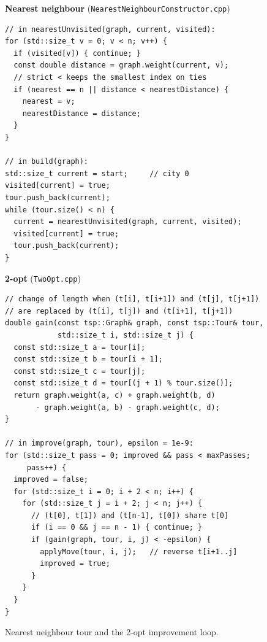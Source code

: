 \documentclass[10pt,a4paper]{article}
\begin{document}
\begin{figure}[H]
\noindent
\begin{minipage}[t]{0.45\linewidth}
\vspace{0pt}
{\footnotesize\raggedright\textbf{Nearest neighbour} (\texttt{NearestNeighbourConstructor.cpp})\par}
\begin{lstlisting}[style=side]
// in nearestUnvisited(graph, current, visited):
for (std::size_t v = 0; v < n; v++) {
  if (visited[v]) { continue; }
  const double distance = graph.weight(current, v);
  // strict < keeps the smallest index on ties
  if (nearest == n || distance < nearestDistance) {
    nearest = v;
    nearestDistance = distance;
  }
}

// in build(graph):
std::size_t current = start;     // city 0
visited[current] = true;
tour.push_back(current);
while (tour.size() < n) {
  current = nearestUnvisited(graph, current, visited);
  visited[current] = true;
  tour.push_back(current);
}
\end{lstlisting}
\end{minipage}\hfill
\begin{minipage}[t]{0.53\linewidth}
\vspace{0pt}
{\footnotesize\raggedright\textbf{2-opt} (\texttt{TwoOpt.cpp})\par}
\begin{lstlisting}[style=side]
// change of length when (t[i], t[i+1]) and (t[j], t[j+1])
// are replaced by (t[i], t[j]) and (t[i+1], t[j+1])
double gain(const tsp::Graph& graph, const tsp::Tour& tour,
            std::size_t i, std::size_t j) {
  const std::size_t a = tour[i];
  const std::size_t b = tour[i + 1];
  const std::size_t c = tour[j];
  const std::size_t d = tour[(j + 1) % tour.size()];
  return graph.weight(a, c) + graph.weight(b, d)
       - graph.weight(a, b) - graph.weight(c, d);
}

// in improve(graph, tour), epsilon = 1e-9:
for (std::size_t pass = 0; improved && pass < maxPasses;
     pass++) {
  improved = false;
  for (std::size_t i = 0; i + 2 < n; i++) {
    for (std::size_t j = i + 2; j < n; j++) {
      // (t[0], t[1]) and (t[n-1], t[0]) share t[0]
      if (i == 0 && j == n - 1) { continue; }
      if (gain(graph, tour, i, j) < -epsilon) {
        applyMove(tour, i, j);   // reverse t[i+1..j]
        improved = true;
      }
    }
  }
}
\end{lstlisting}
\end{minipage}
\caption{Nearest neighbour tour and the 2-opt improvement loop.}
\label{fig-nn2opt}
\end{figure}
\end{document}
